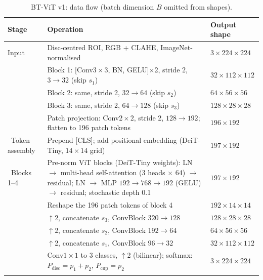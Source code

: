 \documentclass[10pt]{article}
\begin{document}
\begin{table}[h]
\centering
\begin{threeparttable}
\caption{BT-ViT v1: data flow (batch dimension $B$ omitted from shapes).}
\label{tab:flow}
\footnotesize
\setlength{\tabcolsep}{4pt}
\begin{tabular}{@{}l p{9.6cm} l@{}}
\toprule
Stage & Operation & Output shape \\
\midrule
Input & Disc-centred ROI, RGB + CLAHE, ImageNet-normalised & $3{\times}224{\times}224$ \\
\midrule
{}
 & Block 1: [Conv$3{\times}3$, BN, GELU]$\times$2, stride 2, $3\to32$ (skip $s_1$) & $32{\times}112{\times}112$ \\
 & Block 2: same, stride 2, $32\to64$ (skip $s_2$) & $64{\times}56{\times}56$ \\
 & Block 3: same, stride 2, $64\to128$ (skip $s_3$) & $128{\times}28{\times}28$ \\
 & Patch projection: Conv$2{\times}2$, stride 2, $128\to192$; flatten to 196 patch tokens & $196{\times}192$ \\
\midrule
{}\ Token assembly & Prepend [CLS]; add positional embedding (DeiT-Tiny, $14{\times}14$ grid) & $197{\times}192$ \\
\midrule
{}\ Blocks 1--4 & Pre-norm ViT blocks (DeiT-Tiny weights): LN $\to$ multi-head self-attention
(3 heads $\times$ 64) $\to$ residual; LN $\to$ MLP $192\to768\to192$ (GELU) $\to$ residual; stochastic depth 0.1
& $197{\times}192$ \\
\midrule
{}
 & Reshape the 196 patch tokens of block 4 & $192{\times}14{\times}14$ \\
 & $\uparrow$2, concatenate $s_3$, ConvBlock $320\to128$ & $128{\times}28{\times}28$ \\
 & $\uparrow$2, concatenate $s_2$, ConvBlock $192\to64$ & $64{\times}56{\times}56$ \\
 & $\uparrow$2, concatenate $s_1$, ConvBlock $96\to32$ & $32{\times}112{\times}112$ \\
 & Conv$1{\times}1$ to 3 classes, $\uparrow$2 (bilinear); softmax: $P_{\mathrm{disc}}=p_1+p_2$,
 $P_{\mathrm{cup}}=p_2$ & $3{\times}224{\times}224$ \\
\midrule
{}

\end{tabular}
\end{threeparttable}
\end{table}
\end{document}
